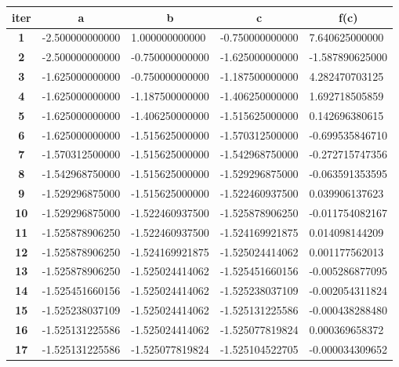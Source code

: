 \documentclass[a4paper, 12pt]{report}
\begin{document}
\begin{table}[h]
\begin{tabular}{|c|l|l|l|l|}
\hline
\textbf{iter} & \multicolumn{1}{c|}{\textbf{a}} & \multicolumn{1}{c|}{\textbf{b}} & \multicolumn{1}{c|}{\textbf{c}} & \multicolumn{1}{c|}{\textbf{f(c)}} \\ \hline
\textbf{1}  & -2.500000000000 & 1.000000000000  & -0.750000000000 & 7.640625000000  \\ \hline
\textbf{2}  & -2.500000000000 & -0.750000000000 & -1.625000000000 & -1.587890625000 \\ \hline
\textbf{3}  & -1.625000000000 & -0.750000000000 & -1.187500000000 & 4.282470703125  \\ \hline
\textbf{4}  & -1.625000000000 & -1.187500000000 & -1.406250000000 & 1.692718505859  \\ \hline
\textbf{5}  & -1.625000000000 & -1.406250000000 & -1.515625000000 & 0.142696380615  \\ \hline
\textbf{6}  & -1.625000000000 & -1.515625000000 & -1.570312500000 & -0.699535846710 \\ \hline
\textbf{7}  & -1.570312500000 & -1.515625000000 & -1.542968750000 & -0.272715747356 \\ \hline
\textbf{8}  & -1.542968750000 & -1.515625000000 & -1.529296875000 & -0.063591353595 \\ \hline
\textbf{9}  & -1.529296875000 & -1.515625000000 & -1.522460937500 & 0.039906137623  \\ \hline
\textbf{10} & -1.529296875000 & -1.522460937500 & -1.525878906250 & -0.011754082167 \\ \hline
\textbf{11} & -1.525878906250 & -1.522460937500 & -1.524169921875 & 0.014098144209  \\ \hline
\textbf{12} & -1.525878906250 & -1.524169921875 & -1.525024414062 & 0.001177562013  \\ \hline
\textbf{13} & -1.525878906250 & -1.525024414062 & -1.525451660156 & -0.005286877095 \\ \hline
\textbf{14} & -1.525451660156 & -1.525024414062 & -1.525238037109 & -0.002054311824 \\ \hline
\textbf{15} & -1.525238037109 & -1.525024414062 & -1.525131225586 & -0.000438288480 \\ \hline
\textbf{16} & -1.525131225586 & -1.525024414062 & -1.525077819824 & 0.000369658372  \\ \hline
\textbf{17} & -1.525131225586 & -1.525077819824 & -1.525104522705 & -0.000034309652 \\ \hline

\end{tabular}
\end{table}
\end{document}
